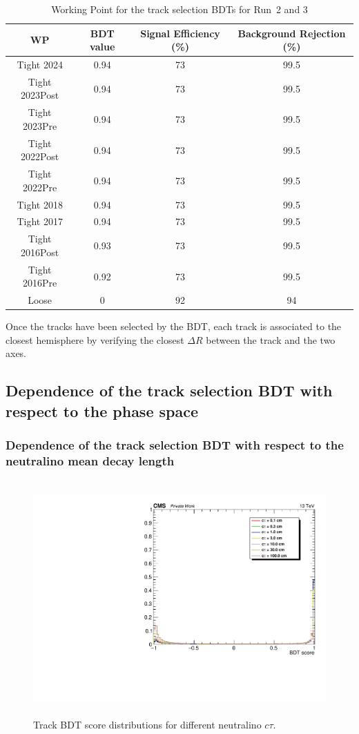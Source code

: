 \documentclass{cernatlasnote}
\begin{document}
\begin{table}[h]
\centering
\begin{tabular}{|c|c|c|c|}
  \hline
  \rowcolor{lightgray} 
  WP & BDT value & Signal Efficiency (\%) & Background Rejection  (\%)\\
  \hline
      Tight 2024 & 0.94 & 73 & 99.5 \\
      Tight 2023Post & 0.94 & 73 & 99.5 \\
      Tight 2023Pre & 0.94 & 73 & 99.5 \\
      Tight 2022Post & 0.94 & 73 & 99.5 \\
      Tight 2022Pre & 0.94 & 73 & 99.5 \\
    Tight 2018 & 0.94 & 73 & 99.5 \\
    Tight 2017 & 0.94 & 73 & 99.5 \\
    Tight 2016Post & 0.93 & 73 & 99.5 \\
    Tight 2016Pre & 0.92 & 73 & 99.5 \\
    \hline
    Loose & 0 & 92 & 94 \\
  \hline
\end{tabular}
    \caption{Working Point for the track selection BDTs for Run~2 and 3}
    \label{tab:TRKBDTWP}
\end{table}

Once the tracks have been selected by the BDT, each track is associated to the closest hemisphere by verifying the closest $\Delta R$ between the track and the two axes.

\subsection{Dependence of the track selection BDT with respect to the phase space}

\subsubsection{Dependence of the track selection BDT with respect to the neutralino mean decay length}

\begin{figure}[ht]
\centering
\includegraphics[height=9cm, width=12cm, trim= 0cm 0cm 0cm 0cm,clip]{images/TRKBDT/plot_BDTTRKvsctau.pdf}
\caption{\label{fig:BDTctau} Track BDT score distributions for different neutralino $c\tau$. }
\end{figure}
\end{document}
